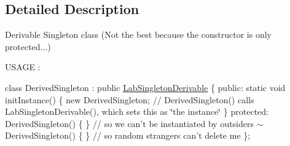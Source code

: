 \subsection{Detailed Description}
Derivable Singleton class (Not the best because the constructor is only protected...)

U\+S\+A\+G\+E \+:

class Derived\+Singleton \+: public \hyperlink{classelps_1_1_lab_singleton_derivable}{Lab\+Singleton\+Derivable} \{ public\+: static void init\+Instance() \{ new Derived\+Singleton; // Derived\+Singleton() calls Lab\+Singleton\+Derivable(), which sets this as \char`\"{}the instance\char`\"{} \} protected\+: Derived\+Singleton() \{ \} // so we can't be instantiated by outsiders $\sim$\+Derived\+Singleton() \{ \} // so random strangers can't delete me \}; 